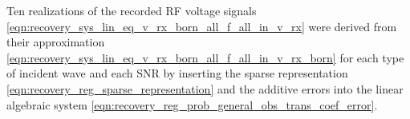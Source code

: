 Ten realizations of
the recorded \ac{RF} voltage signals
\eqref{eqn:recovery_sys_lin_eq_v_rx_born_all_f_all_in_v_rx} were derived from
their  approximation
\eqref{eqn:recovery_sys_lin_eq_v_rx_born_all_f_all_in_v_rx_born} for
each type of
incident wave and
each \ac{SNR} by inserting
the sparse representation
\eqref{eqn:recovery_reg_sparse_representation} and
the additive errors into
the linear algebraic system
\eqref{eqn:recovery_reg_prob_general_obs_trans_coef_error}.
